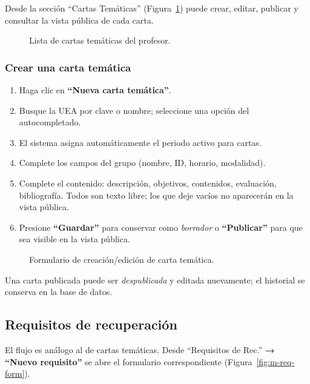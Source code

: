 \documentclass{computacion}
\begin{document}
Desde la sección ``Cartas Temáticas'' (Figura~\ref{fig:m-cartas-lista}) puede crear, editar, publicar y consultar la vista pública de cada carta.

\begin{figure}[!ht]
    \centering
    \caption{Lista de cartas temáticas del profesor.}
    \label{fig:m-cartas-lista}
\end{figure}

\subsubsection{Crear una carta temática}
\begin{enumerate}
    \item Haga clic en \textbf{``Nueva carta temática''}.
    \item Busque la UEA por clave o nombre; seleccione una opción del autocompletado.
    \item El sistema asigna automáticamente el periodo activo para cartas.
    \item Complete los campos del grupo (nombre, ID, horario, modalidad).
    \item Complete el contenido: descripción, objetivos, contenidos, evaluación, bibliografía. Todos son texto libre; los que deje vacíos no aparecerán en la vista pública.
    \item Presione \textbf{``Guardar''} para conservar como \emph{borrador} o \textbf{``Publicar''} para que sea visible en la vista pública.
\end{enumerate}

\begin{figure}[!ht]
    \centering
    \caption{Formulario de creación/edición de carta temática.}
    \label{fig:m-carta-form}
\end{figure}

Una carta publicada puede ser \emph{despublicada} y editada nuevamente; el historial se conserva en la base de datos.

\subsection{Requisitos de recuperación}

El flujo es análogo al de cartas temáticas. Desde ``Requisitos de Rec.'' \textbf{→ ``Nuevo requisito''} se abre el formulario correspondiente (Figura~\ref{fig:m-req-form}).
\end{document}
